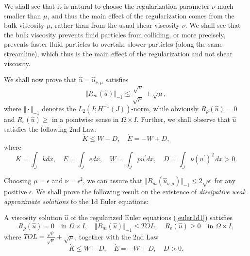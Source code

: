 We shall see that it is natural to choose the regularization parameter
$\nu$ much smaller than $\mu$, and thus the main effect of the regularization
comes from the bulk viscosity $\mu$, rather than from
the usual shear viscosity $\nu$. We shall see that the bulk
viscosity prevents fluid particles from colliding, or more precisely,
prevents faster fluid particles to overtake slower particles
(along the same streamline), which thus is the main effect of the 
regularization and not shear viscosity.
  




We shall now prove that $\hat u=\hat u_{\nu ,\mu}$ satisfies
\begin{equation}\label{euler1dweak}
\Vert R_m(\hat u)\Vert_{-1}\le 
\frac{\sqrt{\nu}}{\sqrt{\mu}}+\sqrt{\mu},
\end{equation}
where $\Vert\cdot\Vert_{-1}$ denotes the $L_2(I;H^{-1}(J))$-norm,
while obviously $R_\rho (\hat u)=0$ and $R_e(\hat u)\ge$ in a pointwise sense
in $\Omega\times I$. 
Further, we shall observe that $\hat u$ satisfies the following 
2nd Law:
\[
\dot K \le W-D,\quad \dot E =-W+D,
\]
where 
\[
K=\int_Jkdx,\quad E=\int_Jedx, \quad W=\int_Jpu^\prime dx, 
\quad D =\int_J \nu (u^\prime )^2\, dx>0.
\]

Choosing $\mu =\epsilon$ and $\nu =\epsilon^2$, we can assure that
$\Vert R_m(\hat u_{\nu ,\mu})\Vert_{-1}\le 2\sqrt{\epsilon}$ for 
any positive $\epsilon$.
We shall prove the following result on the existence
of \emph{dissipative weak approximate solutions} to the 1d Euler equations:

\begin{theorem}\label{exist1d} 
A viscosity solution $\hat u$ of the regularized
Euler equations (\ref{euler1d1}) satisfies 
\[
R_\rho (\hat u)=0\quad \mbox{in }\Omega\times I,\quad \Vert R_m(\hat u)\Vert_{-1}\le TOL,\quad R_e(\hat u)\ge 0\quad\mbox{in }\Omega\times I ,
\]
where $TOL=\frac{\sqrt{\nu}}{\sqrt{\mu}}+\sqrt{\mu}$,
together with the 2nd Law
\begin{equation}\label{2ndlaw1d}
\dot K \le W-D,\quad \dot E =-W+D, \quad D>0.
\end{equation}
\end{theorem}

